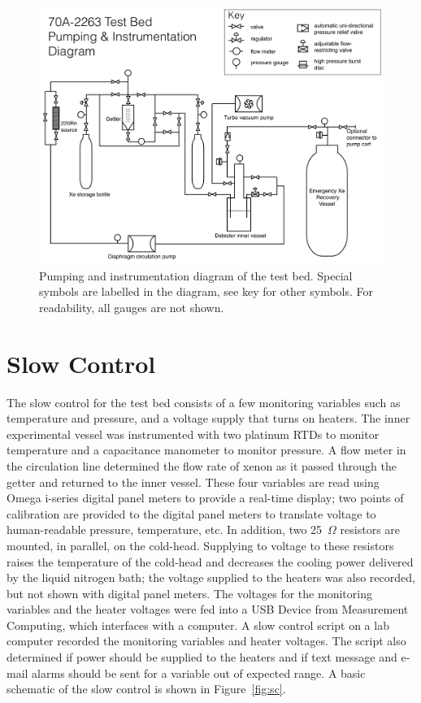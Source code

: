 \begin{figure}[htbp]
\begin{center}
\includegraphics[width=\textwidth]{figures/testbed/full_pid.png}
\caption{Pumping and instrumentation diagram of the test bed. Special symbols are labelled in the diagram, see key for other symbols. For readability, all gauges are not shown.}
\label{fig:circ}
\end{center}
\end{figure}


\section{Slow Control}
The slow control for the test bed consists of a few monitoring variables such as temperature and pressure, and a voltage supply that turns on heaters. The inner experimental vessel was instrumented with two platinum RTDs to monitor temperature and a capacitance manometer to monitor pressure. A flow meter in the circulation line determined the flow rate of xenon as it passed through the getter and returned to the inner vessel. These four variables are read using Omega i-series digital panel meters to provide a real-time display; two points of calibration are provided to the digital panel meters to translate voltage to human-readable pressure, temperature, etc. In addition, two 25~$\Omega$ resistors are mounted, in parallel, on the cold-head. Supplying to voltage to these resistors raises the temperature of the cold-head and decreases the cooling power delivered by the liquid nitrogen bath; the voltage supplied to the heaters was also recorded, but not shown with digital panel meters. The voltages for the monitoring variables and the heater voltages were fed into a USB Device from Measurement Computing, which interfaces with a computer. A slow control script on a lab computer recorded the monitoring variables and heater voltages. The script also determined if power should be supplied to the heaters and if text message and e-mail alarms should be sent for a variable out of expected range. A basic schematic of the slow control is shown in Figure~\ref{fig:sc}.

